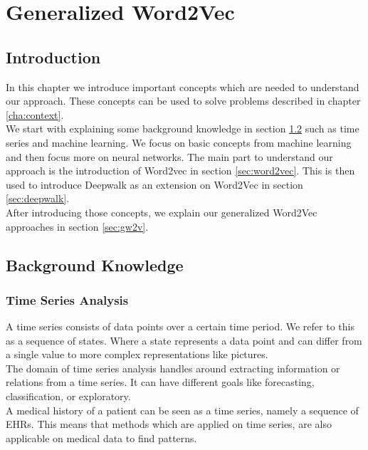 \graphicspath{ {Background/Images/} }


\chapter{Generalized Word2Vec}
\label{cha:background}

\section{Introduction}
In this chapter we introduce important concepts which are needed to understand our approach. These concepts can be used to solve problems described in chapter \ref{cha:context}. \\

We start with explaining some background knowledge in section \ref{sec:bk} such as time series and machine learning. We focus on basic concepts from machine learning and then focus more on neural networks. The main part to understand our approach is the introduction of Word2vec in section \ref{sec:word2vec}. This is then used to introduce Deepwalk as an extension on Word2Vec in section \ref{sec:deepwalk}. \\

After introducing those concepts, we explain our generalized Word2Vec approaches in section \ref{sec:gw2v}.


\section{Background Knowledge}
\label{sec:bk}

	\subsection{Time Series Analysis}
A time series consists of data points over a certain time period. We refer to this as a sequence of states. Where a state represents a data point and can differ from a single value to more complex representations like pictures. \\
The domain of time series analysis handles around extracting information or relations from a time series. It can have different goals like forecasting, classification, or exploratory. \\

A medical history of a patient can be seen as a time series, namely a sequence of EHRs. This means that methods which are applied on time series, are also applicable on medical data to find patterns.

